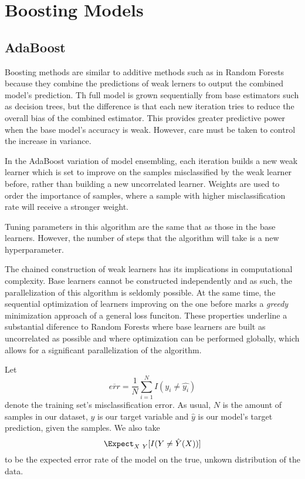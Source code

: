 \section{Boosting Models}\label{section-boosting}
\subsection{AdaBoost}
\cite{schapire-adaBoost}

Boosting methods are similar to additive methods such as in Random Forests because they combine the predictions of weak lerners to output the combined model's prediction. Th full model is grown sequentially from base estimators such as decision trees, but the difference is that each new iteration tries to reduce the overall bias of the combined estimator. This provides greater predictive power when the base model's accuracy is weak. However, care must be taken to control the increase in variance.

In the AdaBoost variation of model ensembling, each iteration builds a new weak learner which is set to improve on the samples misclassified by the weak learner before, rather than building a new uncorrelated learner. Weights are used to order the importance of samples, where a sample with higher misclassification rate will receive a stronger weight. 

Tuning parameters in this algorithm are the same that as those in the base learners. However, the number of steps that the algorithm will take is a new hyperparameter. 

The chained construction of weak learners has its implications in computational complexity. Base learners cannot be constructed independently and as such, the parallelization of this algorithm is seldomly possible. At the same time, the sequential optimization of learners improving on the one before marks a \textit{greedy} minimization approach of a general loss funciton.
These properties underline a substantial diference to Random Forests where base learners are built as uncorrelated as possible and where optimization can be performed globally, which allows for a significant parallelization of the algorithm. 


Let 
$$\overline{err} = \frac{1}{N} \sum_{i=1}^{N} I(y_i \neq \hat{y_i})$$ \label{equation-adaBoostTrainingError}
denote the training set's misclassification error. As usual, $N$ is the amount of samples in our dataset, $y$ is our target variable and $\hat{y}$ is our model's target prediction, given the samples. We also take $$\Expect_{X \ Y} [ I(Y \neq \hat{Y}(X)) ]$$ 
 to be the expected error rate of the model on the true,  unkown distribution of the data.

